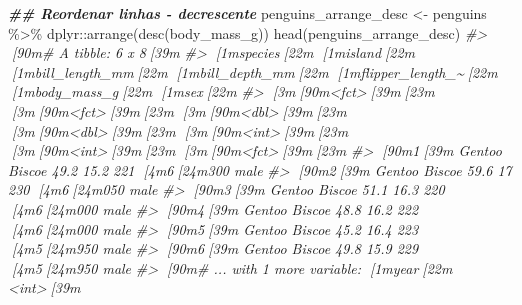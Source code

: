 \documentclass[
]{book}
\newenvironment{Shaded}{\begin{snugshade}}{\end{snugshade}}
\newcommand{\CommentTok}[1]{\textcolor[rgb]{0.37,0.37,0.37}{\textit{#1}}}
\newcommand{\DocumentationTok}[1]{\textcolor[rgb]{0.37,0.37,0.37}{\textbf{\textit{#1}}}}
\newcommand{\FunctionTok}[1]{\textcolor[rgb]{0,0,0}{#1}}
\newcommand{\NormalTok}[1]{#1}
\newcommand{\OtherTok}[1]{\textcolor[rgb]{0.37,0.37,0.37}{#1}}
\newcommand{\SpecialCharTok}[1]{\textcolor[rgb]{0,0,0}{#1}}
\begin{document}
\begin{Shaded}
\begin{Highlighting}[]
\DocumentationTok{\#\# Reordenar linhas {-} decrescente}
\NormalTok{penguins\_arrange\_desc }\OtherTok{\textless{}{-}}\NormalTok{ penguins }\SpecialCharTok{\%\textgreater{}\%} 
\NormalTok{  dplyr}\SpecialCharTok{::}\FunctionTok{arrange}\NormalTok{(}\FunctionTok{desc}\NormalTok{(body\_mass\_g))}
\FunctionTok{head}\NormalTok{(penguins\_arrange\_desc)}
\CommentTok{\#\textgreater{} [90m\# A tibble: 6 x 8[39m}
\CommentTok{\#\textgreater{}   [1mspecies[22m [1misland[22m [1mbill\_length\_mm[22m [1mbill\_depth\_mm[22m [1mflipper\_length\_\textasciitilde{}[22m [1mbody\_mass\_g[22m [1msex[22m  }
\CommentTok{\#\textgreater{}   [3m[90m\textless{}fct\textgreater{}[39m[23m   [3m[90m\textless{}fct\textgreater{}[39m[23m           [3m[90m\textless{}dbl\textgreater{}[39m[23m         [3m[90m\textless{}dbl\textgreater{}[39m[23m            [3m[90m\textless{}int\textgreater{}[39m[23m       [3m[90m\textless{}int\textgreater{}[39m[23m [3m[90m\textless{}fct\textgreater{}[39m[23m}
\CommentTok{\#\textgreater{} [90m1[39m Gentoo  Biscoe           49.2          15.2              221        [4m6[24m300 male }
\CommentTok{\#\textgreater{} [90m2[39m Gentoo  Biscoe           59.6          17                230        [4m6[24m050 male }
\CommentTok{\#\textgreater{} [90m3[39m Gentoo  Biscoe           51.1          16.3              220        [4m6[24m000 male }
\CommentTok{\#\textgreater{} [90m4[39m Gentoo  Biscoe           48.8          16.2              222        [4m6[24m000 male }
\CommentTok{\#\textgreater{} [90m5[39m Gentoo  Biscoe           45.2          16.4              223        [4m5[24m950 male }
\CommentTok{\#\textgreater{} [90m6[39m Gentoo  Biscoe           49.8          15.9              229        [4m5[24m950 male }
\CommentTok{\#\textgreater{} [90m\# ... with 1 more variable: [1myear[22m \textless{}int\textgreater{}[39m}


\end{Highlighting}
\end{Shaded}
\end{document}
